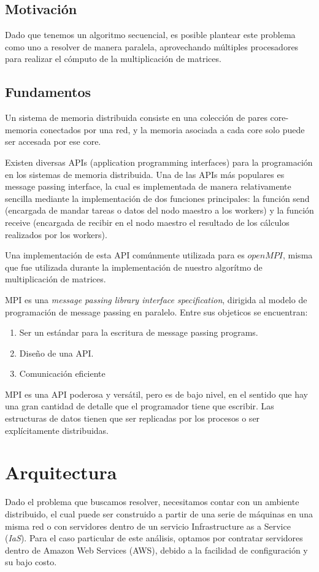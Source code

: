 \documentclass[DIV=calc, paper=letter, fontsize=11pt, twocolumn]{scrartcl}
\begin{document}
\subsection{Motivación}

Dado que tenemos un algoritmo secuencial, es posible plantear este problema como uno a resolver de manera paralela, aprovechando múltiples procesadores para realizar el cómputo de la multiplicación de matrices.

\subsection{Fundamentos}

Un sistema de memoria distribuida consiste en una colección de pares core-memoria conectados por una red, y la memoria asociada a cada core solo puede ser accesada por ese core.

Existen diversas APIs (application programming interfaces) para la programación en los sistemas de memoria distribuida. Una de las APIs más populares es message passing interface, la cual es implementada de manera relativamente sencilla mediante la implementación de dos funciones principales: la función send (encargada de mandar tareas o datos del nodo maestro a los workers) y la función receive (encargada de recibir en el nodo maestro el resultado de los cálculos realizados por los workers).

Una implementación de esta API comúnmente utilizada para es $openMPI$, misma que fue utilizada durante la implementación de nuestro algorítmo de multiplicación de matrices.

MPI es una \textit{message passing library interface specification}, dirigida al modelo de programación de message passing en paralelo. Entre sus objeticos se encuentran:

\begin{enumerate}
    \item Ser un estándar para la escritura de message passing programs.
    \item Diseño de una API.
    \item Comunicación eficiente
\end{enumerate}

MPI es una API poderosa y versátil, pero es de bajo nivel, en el sentido que hay una gran cantidad de detalle que el programador tiene que escribir. Las estructuras de datos tienen que ser replicadas por los procesos o ser explícitamente distribuidas.

\section{Arquitectura}
Dado el problema que buscamos resolver, necesitamos contar con un ambiente distribuido, el cual puede ser construido a partir de una serie de máquinas en una misma red o con servidores dentro de un servicio Infrastructure as a Service (\textit{IaS}). Para el caso particular de este análisis, optamos por contratar servidores dentro de Amazon Web Services (AWS), debido a la facilidad de configuración y su bajo costo.
\end{document}
